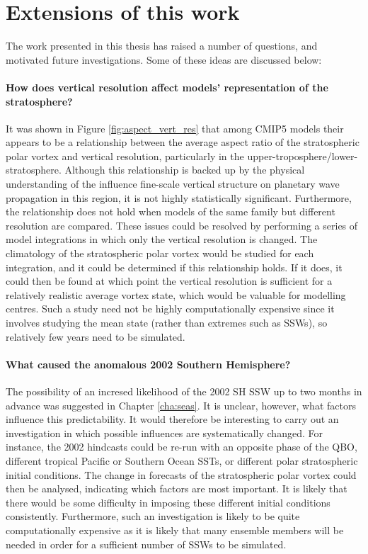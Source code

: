 
\section{Extensions of this work}

The work presented in this thesis has raised a number of questions, and
motivated future investigations. Some of these ideas are discussed below:

\paragraph{How does vertical resolution affect models' representation of the
  stratosphere?} It was shown in Figure \ref{fig:aspect_vert_res} that among
CMIP5 models their appears to be a relationship between the average aspect ratio
of the stratospheric polar vortex and vertical resolution, particularly in the
upper-troposphere/lower-stratosphere. Although this relationship is backed up by
the physical understanding of the influence fine-scale vertical structure on
planetary wave propagation in this region, it is not highly statistically
significant. Furthermore, the relationship does not hold when models of the same
family but different resolution are compared. These issues could be resolved by
performing a series of model integrations in which only the vertical resolution
is changed. The climatology of the stratospheric polar vortex would be studied
for each integration, and it could be determined if this relationship holds. If
it does, it could then be found at which point the vertical resolution is
sufficient for a relatively realistic average vortex state, which would be
valuable for modelling centres. Such a study need not be highly computationally
expensive since it involves studying the mean state (rather than extremes such
as SSWs), so relatively few years need to be simulated.


\paragraph{What caused the anomalous 2002 Southern Hemisphere?} The possibility
of an incresed likelihood of the 2002 SH SSW up to two months in advance was
suggested in Chapter \ref{cha:seas}. It is unclear, however, what factors
influence this predictability. It would therefore be interesting to carry out an
investigation in which possible influences are systematically changed. For
instance, the 2002 hindcasts could be re-run with an opposite phase of the QBO,
different tropical Pacific or Southern Ocean SSTs, or different polar
stratospheric initial conditions. The change in forecasts of the stratospheric
polar vortex could then be analysed, indicating which factors are most
important. It is likely that there would be some difficulty in imposing these
different initial conditions consistently. Furthermore, such an investigation is
likely to be quite computationally expensive as it is likely that many ensemble
members will be needed in order for a sufficient number of SSWs to be simulated.

